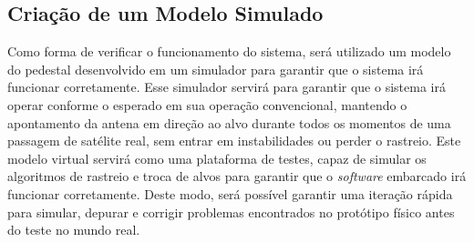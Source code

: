 \subsection{Criação de um Modelo Simulado}
Como forma de verificar o funcionamento do sistema, será utilizado um modelo do pedestal desenvolvido em um simulador para garantir que o sistema irá funcionar corretamente.
Esse simulador servirá para garantir que o sistema irá operar conforme o esperado em sua operação convencional, mantendo o apontamento da antena em direção ao alvo durante todos os momentos de uma passagem de satélite real, sem entrar em instabilidades ou perder o rastreio.
Este modelo virtual servirá como uma plataforma de testes, capaz de simular os algoritmos de rastreio e troca de alvos para garantir que o \textit{software} embarcado irá funcionar corretamente.
Deste modo, será possível garantir uma iteração rápida para simular, depurar e corrigir problemas encontrados no protótipo físico antes do teste no mundo real.